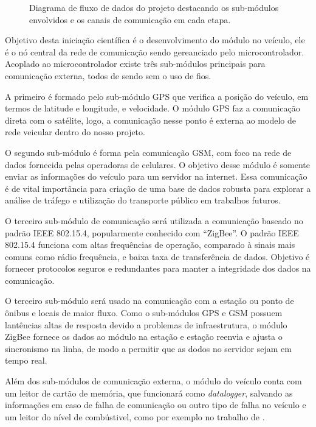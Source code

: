 \documentclass[12pt,report]{uftpibic}
\begin{document}
\begin{figure}[!htpb]
\centering
\caption{Diagrama de fluxo de dados do projeto destacando os sub-módulos envolvidos e os canais de comunicação em cada etapa.}
\label{fig:projeto}
\end{figure}

Objetivo desta iniciação científica é o desenvolvimento do módulo no veículo, ele é o nó central da rede de comunicação sendo gereanciado pelo microcontrolador. Acoplado ao microcontrolador existe três sub-módulos principais para comunicação externa, todos de sendo sem o uso de fios. 

A primeiro é formado pelo sub-módulo GPS que verifica a posição do veículo, em termos de latitude e longitude, e velocidade. O módulo GPS faz a comunicação direta com o satélite, logo, a comunicação nesse ponto é externa ao modelo de rede veicular dentro do nosso projeto. 

O segundo sub-módulo é forma pela comunicação GSM, com foco na rede de dados fornecida pelas operadoras de celulares. O objetivo desse módulo é somente enviar as informações do veículo para um servidor na internet. Essa comunicação é de vital importância para criação de uma base de dados robusta para explorar a análise de tráfego e utilização do transporte público em trabalhos futuros.

O terceiro sub-módulo de comunicação será utilizada a comunicação baseado no padrão IEEE 802.15.4, popularmente conhecido com ``ZigBee''. O padrão IEEE 802.15.4 funciona com altas frequências de operação, comparado à sinais mais comuns como rádio frequência, e baixa taxa de transferência de dados. Objetivo é fornecer protocolos seguros e redundantes para manter a integridade dos dados na comunicação. 

O terceiro sub-módulo será usado na comunicação com a estação ou ponto de ônibus e locais de maior fluxo. Como o sub-módulos GPS e GSM possuem lantências altas de resposta devido a problemas de infraestrutura, o módulo ZigBee fornece os dados ao módulo na estação e estação reenvia e ajusta o sincronismo na linha, de modo a permitir que as dodos no servidor sejam em tempo real.

Além dos sub-módulos de comunicação externa, o módulo do veículo conta com um leitor de cartão de memória, que funcionará como \textit{datalogger}, salvando as informações em caso de falha de comunicação ou outro tipo de falha no veículo e um leitor do nível de combústivel, como por exemplo no trabalho de . 
\end{document}
